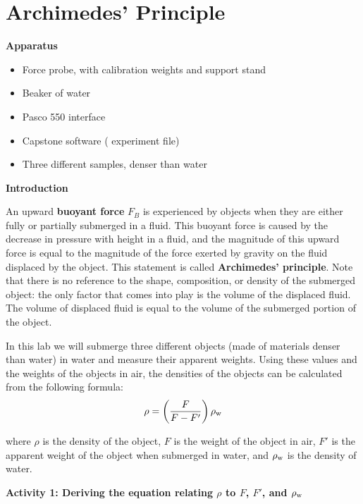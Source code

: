 \section{Archimedes' Principle}

\makelabheader %


\bigskip
\textbf{Apparatus}

\begin{itemize}[nosep]
\item Force probe, with calibration weights and support stand
\item Beaker of water
\item Pasco 550 interface
\item Capstone software ( experiment file)
\item Three different samples, denser than water
\end{itemize}

\bigskip
\textbf{Introduction}

An upward \textbf{buoyant force} $F_B$ is experienced by objects when they are either fully or partially submerged in a fluid. This buoyant force is caused by the decrease in pressure with height in a fluid, and the magnitude of this upward force is equal to the magnitude of the force exerted by gravity on the fluid displaced by the object. 
This statement is called \textbf{Archimedes' principle}. Note that there is no reference to the shape, composition, or density of the submerged object: the only factor that comes into play is the volume of the displaced fluid. 
The volume of displaced fluid is equal to the volume of the submerged portion of the object.

In this lab we will submerge three different objects (made of materials denser than water) in water and measure their apparent weights. Using these values and the weights of the objects in air, the densities of the objects can be calculated from the following formula:
\begin{equation}
\rho = \left( \frac{F}{F-F'}\right)\rho_{\rm w}
\label{equation_archimedes_density}
\end{equation}

where $\rho$ is the density of the object, $F$ is the weight of the object in air, $F'$ is the apparent weight of the object when submerged in water, and $\rho_{\rm w}$ is the density of water.

\bigskip
\textbf{Activity 1: Deriving the equation relating $\rho$ to $F$, $F'$, and $\rho_{\rm w}$}


